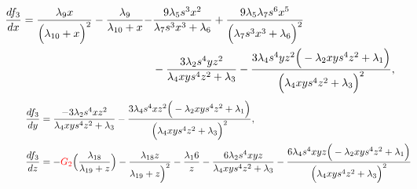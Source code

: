 \documentclass{svjour3}
\begin{document}
{\footnotesize
\begin{align*}
\hspace{-0.9cm} \frac{df_3}{dx}=\frac{\lambda_9x}{\Big(\lambda_{10}+x \Big)^2} - 
\frac{\lambda_9}{\lambda_{10}+x}-&\frac{9\lambda_5s^3x^2}{\lambda_7s^3x^3+\lambda_6}+\frac{9\lambda_5 \lambda_7 s^6 x^5}{\Big(\lambda_7s^3x^3+\lambda_6\Big)^2} \\
& -\frac{3\lambda_2s^4yz^2}{\lambda_4xys^4z^2+\lambda_3}-\frac{3\lambda_4s^4yz^2\Big(-\lambda_2xys^4z^2+\lambda_1\Big)}{\Big(\lambda_4xys^4z^2+\lambda_3\Big)^2}, \\
\end{align*}
\vspace{-1cm}
\begin{align*}
&\hspace{0.3cm} \frac{df_3}{dy}= \frac{-3 \lambda_2s^4 x z^2}{\lambda_4 xys^4z^2 + \lambda_3}- \frac{3\lambda_4 s^4 x z^2 \Big(-\lambda_2xys^4z^2+\lambda_1\Big)}{\Big(\lambda_4xys^4z^2+\lambda_3\Big)^2},\\
&\hspace{0.3cm} \frac{df_3}{dz}=-{\color{red}G_{2}} \Big(\frac{\lambda_{18}}{\lambda_{19} + z}\Big) -\frac{\lambda_{18} z}{\lambda_{19} + z\Big)^2}-\frac{\lambda_16}{z} - \frac{6 \lambda_2 s^4xyz}{\lambda_4xys^4z^2+ \lambda_3} - \frac{6 \lambda_4s^4xyz\Big(-\lambda_2xys^4z^2 + \lambda_1\Big)}{\Big(\lambda_4xys^4z^2+\lambda_3\Big)^2}
\end{align*}
}



      
 
\end{document}
